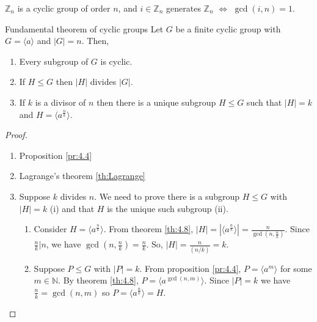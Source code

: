 \documentclass[12pt]{article}
\newcommand{\N}{\mathbb{N}}
\newcommand{\Z}{\mathbb{Z}}
\begin{document}
	\begin{mycor}{}{}
		$\Z_n$ is a cyclic group of order $n$, and $i\in\Z_n$ generates $\Z_n$ $\Longleftrightarrow$ $\gcd(i, n)=1$.
	\end{mycor}
	
	\begin{mythm}{Fundamental theorem of cyclic groups}{}
		Let $G$ be a finite cyclic group with $G=\langle a\rangle$ and $|G|=n$. Then,
		\begin{enumerate}
			\item Every subgroup of $G$ is cyclic.
			\item If $H\leq G$ then $|H|$ divides $|G|$.
			\item If $k$ is a divisor of $n$ then there is a unique subgroup $H\leq G$ such that $|H|=k$ and $H=\langle a^{\frac{n}{k}}\rangle$.
		\end{enumerate}
		\begin{proof}~\\
			\begin{enumerate}
				\item Proposition \ref{pr:4.4}
				\item Lagrange's theorem \ref{th:Lagrange}
				\item Suppose $k$ divides $n$. We need to prove there is a subgroup $H\leq G$ with $|H|=k$ (i) and that $H$ is the unique such subgroup (ii).
				\begin{enumerate}[label=(\roman*)]
					\item Consider $H=\langle a^{\frac{n}{k}}\rangle$. From theorem \ref{th:4.8}, $|H|=|\langle a^{\frac{n}{k}}\rangle|=\frac{n}{\gcd(n, \frac{n}{k})}$. Since $\frac{n}{k}|n$, we have $\gcd(n, \frac{n}{k})=\frac{n}{k}$. So, $|H|=\frac{n}{(n/k)}=k$.
					
					\item Suppose $P\leq G$ with $|P|=k$. From proposition \ref{pr:4.4}, $P=\langle a^m\rangle$ for some $m\in\N$. By theorem \ref{th:4.8}, $P=\langle a^{\gcd(n, m)}\rangle$. Since $|P|=k$ we have $\frac{n}{k}=\gcd(n, m)$ so $P=\langle a^{\frac{n}{k}}\rangle=H$.
				\end{enumerate}
			\end{enumerate}
		\end{proof}
	\end{mythm}
	
\end{document}
